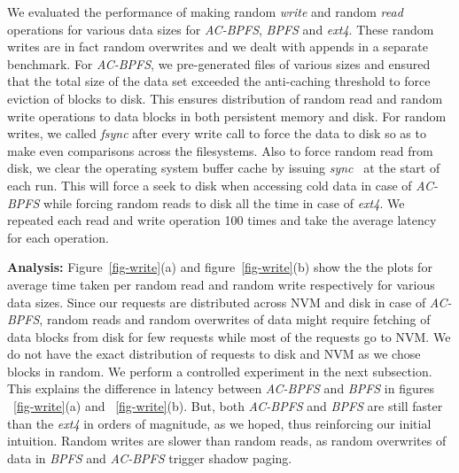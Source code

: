 We evaluated the performance of making random \textit{write} and random \textit{read} operations for various data sizes for \textit{AC-BPFS}, \textit{BPFS} and \textit{ext4}. These random writes are in fact random overwrites and we dealt with appends in a separate benchmark. For \textit{AC-BPFS}, we pre-generated files of various sizes and ensured that the total size of the data set exceeded the anti-caching threshold to force eviction of blocks to disk. This ensures distribution of random read and random write operations to data blocks in both persistent memory and disk. For random writes, we called \textit{fsync} after every write call to force the data to disk so as to make even comparisons across the filesystems. Also to force random read from disk, we clear the operating system buffer cache by issuing \textit{sync}~\cite{sync} at the start of each run. This will force a seek to disk when accessing cold data in case of \textit{AC-BPFS} while forcing random reads to disk all the time in case of \textit{ext4}. We repeated each read and write operation 100 times and take the average latency for each operation.

\textbf{Analysis:} Figure~\ref{fig-write}(a) and figure~\ref{fig-write}(b) show the the plots for average time taken per random read and random write respectively for various data sizes. Since our requests are distributed across NVM and disk in case of \textit{AC-BPFS}, random reads and random overwrites of data might require fetching of data blocks from disk for few requests while most of the requests go to NVM. We do not have the exact distribution of requests to disk and NVM as we chose blocks in random. We perform a controlled experiment in the next subsection. This explains the difference in latency between \textit{AC-BPFS} and \textit{BPFS} in figures ~\ref{fig-write}(a) and ~\ref{fig-write}(b). But, both \textit{AC-BPFS} and \textit{BPFS} are still faster than the \textit{ext4} in orders of magnitude, as we hoped, thus reinforcing our initial intuition. Random writes are slower than random reads, as random overwrites of data in \textit{BPFS} and \textit{AC-BPFS} trigger shadow paging.

